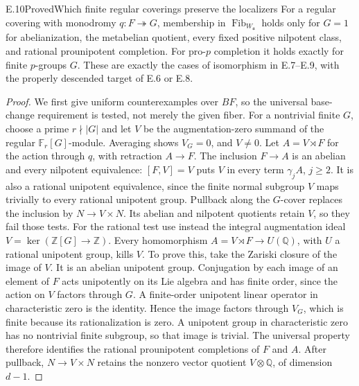 \begin{statement}{E.10}{Proved}{Which finite regular coverings preserve the localizers}
For a regular covering with monodromy $q:F\twoheadrightarrow G$,
membership in $\operatorname{Fib}_{W_{\mathfrak a}}$ holds only for
$G=1$ for abelianization, the metabelian quotient, every fixed
positive nilpotent class, and rational prounipotent completion.
For pro-$p$ completion it holds exactly for finite $p$-groups $G$.
These are exactly the cases of isomorphism in E.7--E.9, with the
properly descended target of E.6 or E.8.
\end{statement}
\begin{proof}
We first give uniform counterexamples over $BF$, so the universal
base-change requirement is tested, not merely the given fiber.
For a nontrivial finite $G$, choose a prime $r\nmid |G|$ and let
$V$ be the augmentation-zero summand of the regular
$\mathbb F_r[G]$-module. Averaging shows $V_G=0$, and $V\ne0$.
Let $A=V\rtimes F$ for the action through $q$, with retraction
$A\to F$. The inclusion $F\to A$ is an abelian and every
nilpotent equivalence: $[F,V]=V$ puts $V$ in every term
$\gamma_jA$, $j\geq2$. It is also a rational unipotent
equivalence, since the finite normal subgroup $V$ maps trivially
to every rational unipotent group. Pullback along the $G$-cover
replaces the inclusion by $N\to V\times N$. Its abelian and
nilpotent quotients retain $V$, so they fail those tests.
For the rational test use instead the integral augmentation ideal
$V=\ker(\mathbb Z[G]\to\mathbb Z)$. Every homomorphism
$A=V\rtimes F\to U(\mathbb Q)$, with $U$ a rational unipotent
group, kills $V$. To prove this, take the Zariski closure of the
image of $V$. It is an abelian unipotent group. Conjugation by
each image of an element of $F$ acts unipotently on its Lie
algebra and has finite order, since the action on $V$ factors
through $G$. A finite-order unipotent linear operator in
characteristic zero is the identity. Hence the image factors
through $V_G$, which is finite because its rationalization is
zero. A unipotent group in characteristic zero has no nontrivial
finite subgroup, so that image is trivial. The universal property
therefore identifies the rational prounipotent completions of
$F$ and $A$. After pullback, $N\to V\times N$ retains the
nonzero vector quotient $V\otimes\mathbb Q$, of dimension $d-1$.


\end{proof}
